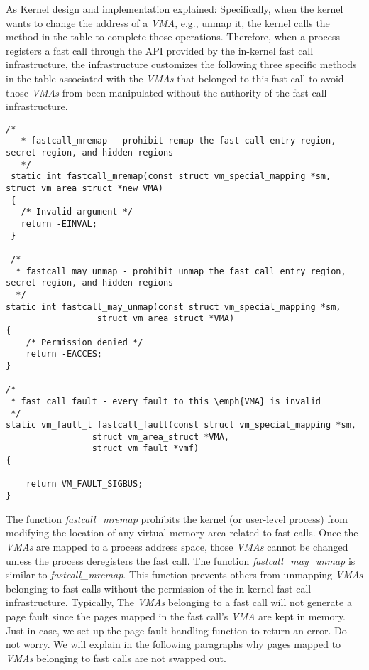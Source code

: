 As Kernel design and implementation explained: Specifically, when the kernel wants to change 
the address of a \emph{VMA}, e.g., unmap it, the kernel calls the method in the table to complete 
those operations. Therefore, when a process registers a fast call through the API provided 
by the in-kernel fast call infrastructure, the infrastructure customizes the following three 
specific methods in the table associated with the \emph{VMAs} that belonged to this fast call to avoid 
those \emph{VMAs} from been manipulated without the authority of the fast call infrastructure.
\begin{lstlisting}[style=CStyle]
  /*
   * fastcall_mremap - prohibit remap the fast call entry region, secret region, and hidden regions
   */
 static int fastcall_mremap(const struct vm_special_mapping *sm, struct vm_area_struct *new_VMA)
 {
   /* Invalid argument */
   return -EINVAL;
 }

 /*
  * fastcall_may_unmap - prohibit unmap the fast call entry region, secret region, and hidden regions
  */
static int fastcall_may_unmap(const struct vm_special_mapping *sm,
			      struct vm_area_struct *VMA)
{
	/* Permission denied */
	return -EACCES;
}

/*
 * fast call_fault - every fault to this \emph{VMA} is invalid
 */
static vm_fault_t fastcall_fault(const struct vm_special_mapping *sm,
				 struct vm_area_struct *VMA,
				 struct vm_fault *vmf)
{

	return VM_FAULT_SIGBUS;
}
\end{lstlisting}

The function \emph{fastcall\_mremap} prohibits the kernel 
(or user-level process) from modifying the location of any virtual 
memory area related to fast calls. Once the \emph{VMAs} are mapped to a 
process address space, those \emph{VMAs}  cannot 
be changed unless the process deregisters the fast call. The function 
\emph{fastcall\_may\_unmap} is similar to \emph{fastcall\_mremap}. This function 
prevents others from unmapping \emph{VMAs} belonging to fast 
calls without the permission of the in-kernel fast call infrastructure. 
Typically, The \emph{VMAs}  belonging to a 
fast call will not generate a page fault since the pages mapped in the 
fast call's \emph{VMA} are kept in memory. Just in case, we set up the page fault 
handling function to return an error. Do not worry. We will explain in 
the following paragraphs why pages mapped to \emph{VMAs} belonging to fast calls 
are not swapped out.


